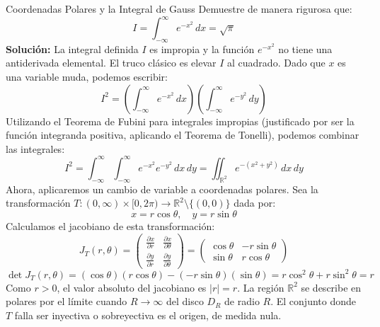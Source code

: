 \documentclass[11pt,a4paper]{article}
\begin{document}
\begin{ejerciciobox}{Coordenadas Polares y la Integral de Gauss}
Demuestre de manera rigurosa que:
\begin{equation*}
I = \int_{-\infty}^{\infty} e^{-x^2} \, dx = \sqrt{\pi}
\end{equation*}
\textbf{Solución:}
La integral definida $I$ es impropia y la función $e^{-x^2}$ no tiene una antiderivada elemental. El truco clásico es elevar $I$ al cuadrado. Dado que $x$ es una variable muda, podemos escribir:
\begin{equation*}
I^2 = \left( \int_{-\infty}^{\infty} e^{-x^2} \, dx \right) \left( \int_{-\infty}^{\infty} e^{-y^2} \, dy \right)
\end{equation*}
Utilizando el Teorema de Fubini para integrales impropias (justificado por ser la función integranda positiva, aplicando el Teorema de Tonelli), podemos combinar las integrales:
\begin{equation*}
I^2 = \int_{-\infty}^{\infty} \int_{-\infty}^{\infty} e^{-x^2} e^{-y^2} \, dx \, dy = \iint_{\mathbb{R}^2} e^{-(x^2+y^2)} \, dx \, dy
\end{equation*}
Ahora, aplicaremos un cambio de variable a coordenadas polares. Sea la transformación $T: (0, \infty) \times [0, 2\pi) \to \mathbb{R}^2 \setminus \{(0,0)\}$ dada por:
\begin{equation*}
x = r \cos \theta, \quad y = r \sin \theta
\end{equation*}
Calculamos el jacobiano de esta transformación:
\begin{equation*}
J_T(r, \theta) = \begin{pmatrix} \frac{\partial x}{\partial r} & \frac{\partial x}{\partial \theta} \\ \frac{\partial y}{\partial r} & \frac{\partial y}{\partial \theta} \end{pmatrix} = \begin{pmatrix} \cos \theta & -r \sin \theta \\ \sin \theta & r \cos \theta \end{pmatrix}
\end{equation*}
\begin{equation*}
\det J_T(r, \theta) = (\cos \theta)(r \cos \theta) - (-r \sin \theta)(\sin \theta) = r \cos^2 \theta + r \sin^2 \theta = r
\end{equation*}
Como $r > 0$, el valor absoluto del jacobiano es $|r| = r$. La región $\mathbb{R}^2$ se describe en polares por el límite cuando $R \to \infty$ del disco $D_R$ de radio $R$. El conjunto donde $T$ falla ser inyectiva o sobreyectiva es el origen, de medida nula.

\end{ejerciciobox}
\end{document}
